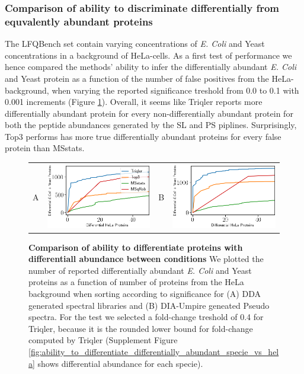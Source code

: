 \documentclass[10pt,letterpaper]{article}
\begin{document}
\subsubsection*{Comparison of ability to discriminate differentially from equvalently abundant proteins}

The LFQBench set contain varying concentrations of {\em E. Coli} and Yeast concentrations in a background of HeLa-cells. As a first test of performance we hence compared the methods' ability to infer the differentially abundant {\em E. Coli} and Yeast protein as a function of the number of false positives from the HeLa-background, when varying the reported significance treshold from 0.0 to 0.1 with 0.001 increments (Figure \ref{fig:diff_vs_hela}). Overall, it seems like Triqler reports more differentially abundant protein for every non-differentially abundant protein for both the peptide abundances generated by the SL and PS piplines. Surprisingly, Top3 performs has more true differentially abundant proteins for every false protein than MSstats. 


\begin{figure}[hbt]
    \centering
    \begin{tabular}{lclc} 
        A & \includegraphics[width=0.45\linewidth]{../../result/report_plots_filtered/osw_de_human_vs_ecoli_and_yeast.png} & 
        B & \includegraphics[width=0.45\linewidth]{../../result/report_plots_filtered/diann_de_human_vs_ecoli_and_yeast.png} \\ 

    \end{tabular} 
    \caption{{\bf Comparison of ability to differentiate proteins with differentiall abundance between conditions} We plotted the number of reported differentially abundant  {\em E. Coli} and Yeast proteins as a function of number of proteins from the HeLa background when sorting according to significance for (A) DDA generated spectral libraries and (B) DIA-Umpire geneated Pseudo spectra. For the test we selected a fold-change treshold of 0.4 for Triqler, because it is the rounded lower bound for fold-change computed by Triqler (Supplement Figure \ref{fig:ability_to_differentiate_differentially_abundant_specie_vs_hela} shows differential abundance for each specie). \label{fig:diff_vs_hela}}
\end{figure}
\end{document}
